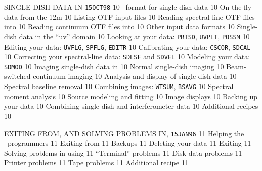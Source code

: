     {SINGLE-DISH DATA IN \AIPS%
}                    {{\tt 15OCT98}\hskip 0.6cm 10}
  {\AIPS\ format for single-dish data}          {10}
 {On-the-fly data from the 12m}               {10}
 {Listing OTF input files}                  {10}
 {Reading spectral-line OTF files into
                      \AIPS}                                  {10}
 {Reading continuum OTF files into \AIPS}   {10}
 {Other input data formats}                   {10}
  {Single-dish data in the ``uv'' domain}       {10}
 {Looking at your data: {\tt PRTSD},
                       {\tt UVPLT}, {\tt POSSM}}              {10}
 {Editing your data: {\tt UVFLG}, {\tt SPFLG},
                       {\tt EDITR}}                           {10}
 {Calibrating your data: {\tt CSCOR},
                       {\tt SDCAL}}                           {10}
 {Correcting your spectral-line data:
                       {\tt SDLSF} and {\tt SDVEL}}           {10}
 {Modeling your data: {\tt SDMOD}}            {10}
  {Imaging single-dish data in \AIPS}           {10}
 {Normal single-dish imaging}                 {10}
 {Beam-switched continuum imaging}            {10}
  {Analysis and display of single-dish data}    {10}
 {Spectral baseline removal}                  {10}
 {Combining images: {\tt WTSUM}, {\tt BSAVG}} {10}
 {Spectral moment analysis}                   {10}
 {Source modeling and fitting}                {10}
 {Image displays}                             {10}
 {Backing up your data}                       {10}
  {Combining single-dish and interferometer
                       data}                                  {10}
  {Additional recipes}                          {10}

    {EXITING FROM, AND SOLVING PROBLEMS IN, \AIPS%
}                    {{\tt 15JAN96}\hskip 0.6cm 11}
  {Helping the \AIPS\ programmers}              {11}
  {Exiting from \AIPS}                          {11}
 {Backups}                                    {11}
 {Deleting your data}                         {11}
 {Exiting}                                    {11}
  {Solving problems in using \AIPS}             {11}
 {``Terminal'' problems}                      {11}
 {Disk data problems}                         {11}
 {Printer problems}                           {11}
 {Tape problems}                              {11}
  {Additional recipe}                           {11}

